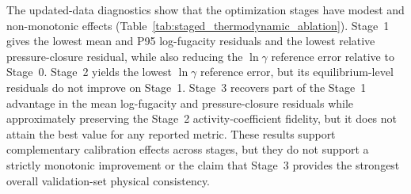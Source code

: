 The updated-data diagnostics show that the optimization stages have modest and non-monotonic effects (Table~\ref{tab:staged_thermodynamic_ablation}). Stage~1 gives the lowest mean and P95 log-fugacity residuals and the lowest relative pressure-closure residual, while also reducing the $\ln\gamma$ reference error relative to Stage~0. Stage~2 yields the lowest $\ln\gamma$ reference error, but its equilibrium-level residuals do not improve on Stage~1. Stage~3 recovers part of the Stage~1 advantage in the mean log-fugacity and pressure-closure residuals while approximately preserving the Stage~2 activity-coefficient fidelity, but it does not attain the best value for any reported metric. These results support complementary calibration effects across stages, but they do not support a strictly monotonic improvement or the claim that Stage~3 provides the strongest overall validation-set physical consistency.
